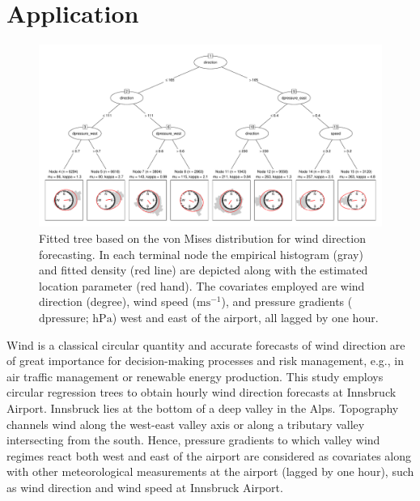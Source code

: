 \documentclass[twoside]{report}
\begin{document}
\section{Application}

\begin{figure}[p!]\centering
\includegraphics[height = .5\textheight,angle=90,origin=c]{schlosser-circtree_plot.pdf}
\caption{Fitted tree based on the von Mises distribution for wind direction forecasting.
In each terminal node the empirical histogram (gray) and fitted density (red line)
are depicted along with the estimated location parameter (red hand). The covariates
employed are wind direction (degree), wind speed ($\text{ms}^{-1}$),
and pressure gradients ($\text{dpressure; hPa}$) west and east of the airport,
all lagged by one hour.}
\label{schlosser:fig_tree} \end{figure}

Wind is a classical circular quantity and accurate forecasts of wind direction
are of great importance for decision-making processes and risk management,
e.g., in air traffic management or renewable energy production. This study
employs circular regression trees to obtain hourly wind direction
forecasts at Innsbruck Airport.
Innsbruck lies at the bottom of a deep valley in the Alps. Topography
channels wind along the west-east valley axis or along a tributary valley
intersecting from the south. Hence, pressure gradients to which valley wind
regimes react both west and east of the airport are considered as covariates
along with other meteorological measurements at the airport (lagged by one hour),
such as wind direction and wind speed at Innsbruck Airport.
\end{document}
